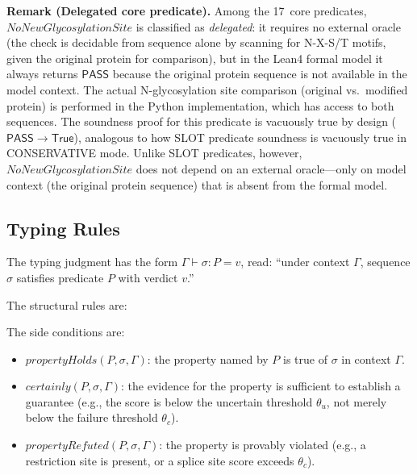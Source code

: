 \documentclass[acmsmall,review,anonymous]{acmart}
\newcommand{\PASS}{\ensuremath{\mathsf{PASS}}\xspace}
\newcommand{\FAIL}{\ensuremath{\mathsf{FAIL}}\xspace}
\newcommand{\UNCERTAIN}{\ensuremath{\mathsf{UNCERTAIN}}\xspace}
\newcommand{\seq}{\sigma}
\newcommand{\pred}{P}
\newcommand{\verdict}{v}
\newcommand{\judg}[3]{#1 \vdash #2 : #3}
\begin{document}
\noindent\textbf{Remark (Delegated core predicate).}
Among the 17~core predicates, $\mathit{NoNewGlycosylationSite}$ is
classified as \emph{delegated}: it requires no external oracle (the
check is decidable from sequence alone by scanning for N-X-S/T motifs,
given the original protein for comparison), but in the Lean4 formal
model it always returns \PASS{} because the original protein sequence
is not available in the model context.  The actual N-glycosylation site
comparison (original vs.\ modified protein) is performed in the Python
implementation, which has access to both sequences.  The soundness
proof for this predicate is vacuously true by design
($\PASS \to \mathsf{True}$), analogous to how SLOT predicate soundness
is vacuously true in CONSERVATIVE mode.  Unlike SLOT predicates,
however, $\mathit{NoNewGlycosylationSite}$ does not depend on an
external oracle---only on model context (the original protein sequence)
that is absent from the formal model.

\subsection{Typing Rules}\label{sec:typingrules}

The typing judgment has the form
$\judg{\Gamma}{\seq}{\pred} = \verdict$, read: ``under context
$\Gamma$, sequence $\seq$ satisfies predicate $\pred$ with verdict
$\verdict$.''

The structural rules are:


\noindent The side conditions are:
\begin{itemize}[leftmargin=*,itemsep=0pt,topsep=1pt]
\item $\mathit{propertyHolds}(\pred, \seq, \Gamma)$: the property
      named by $\pred$ is true of $\seq$ in context $\Gamma$.
\item $\mathit{certainly}(\pred, \seq, \Gamma)$: the evidence for
      the property is sufficient to establish a guarantee (e.g., the
      score is below the uncertain threshold $\theta_u$, not merely
      below the failure threshold $\theta_c$).
\item $\mathit{propertyRefuted}(\pred, \seq, \Gamma)$: the property
      is provably violated (e.g., a restriction site is present, or
      a splice site score exceeds $\theta_c$).
\end{itemize}
\end{document}
